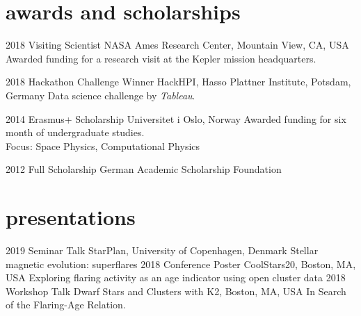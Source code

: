 \documentclass[]{k-cv} %
\begin{document}

\section{awards and scholarships}

\begin{entrylist}
\entry
{2018}
{Visiting Scientist}
{NASA Ames Research Center, Mountain View, CA, USA}
{Awarded funding for a research visit at the Kepler mission headquarters.}

\entry
{2018}
{Hackathon Challenge Winner}
{HackHPI, Hasso Plattner Institute, Potsdam, Germany}
{Data science challenge by \emph{Tableau}.}

\entry
{2014}
{Erasmus+ Scholarship}
{Universitet i Oslo, Norway}
{Awarded funding for six month of undergraduate studies.\\
Focus: Space Physics, Computational Physics}

\entry
{2012 }
{Full Scholarship}
{German Academic Scholarship Foundation}


\end{entrylist}

\clearpage



\section{presentations}

\begin{entrylist}
\entry
{2019}
{Seminar Talk}
{StarPlan, University of Copenhagen, Denmark}
{Stellar magnetic evolution: superflares}
\entry
{2018}
{Conference Poster}
{CoolStars20, Boston, MA, USA}
{Exploring flaring activity as an age indicator using open cluster data}
\entry
{2018}
{Workshop Talk}
{Dwarf Stars and Clusters with K2, Boston, MA, USA}
{In Search of the Flaring-Age Relation.}
\end{entrylist}

\end{document}
